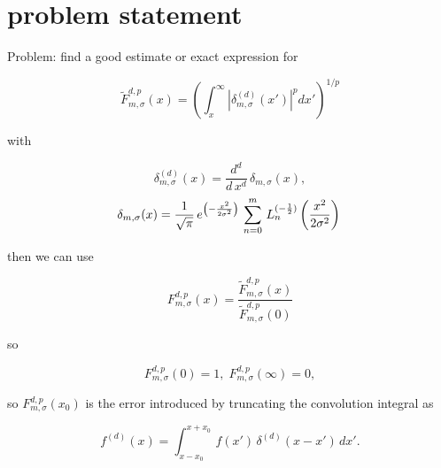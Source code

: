 \documentclass{article}
\begin{document}
\section{problem statement}

\begin{flushleft}
Problem: find a good estimate or exact expression for
\end{flushleft}

\begin{equation*}
\tilde{F}_{m,\sigma}^{d,p}(x) = \left( \int_x^\infty | \delta^{(d)}_{m,\sigma}(x') |^p dx'   \right)^{1/p}
\end{equation*}

\begin{flushleft}
with
\end{flushleft}

\begin{equation*}
\delta^{(d)}_{m,\sigma}(x) = \frac{d^d}{d \, x^d} \, \delta_{m,\sigma} (x),
\end{equation*}
\begin{equation*}
 \delta_{m,\sigma} (x) = \frac{1}{\sqrt{\pi}} \, e^{ \left( -\frac{x^2}{2 \sigma^2} \right)} \, \sum_{n=0}^{m} \, L_n^{(-\frac{1}{2})}   \left( \frac{x^2}{2 \sigma^2} \right) \\
\end{equation*}


\begin{flushleft}
then we can use 
\end{flushleft}

\begin{equation*}
F_{m,\sigma}^{d,p}(x) = \frac{ \tilde{F}_{m,\sigma}^{d,p}(x) }{ \tilde{F}_{m,\sigma}^{d,p}(0) }
\end{equation*}

\begin{flushleft}
so
\end{flushleft}

\begin{equation*}
F_{m,\sigma}^{d,p}(0) = 1, \; F_{m,\sigma}^{d,p}(\infty) = 0, 
\end{equation*}

\begin{flushleft}
so $F_{m,\sigma}^{d,p}(x_0)$ is the error introduced by truncating the convolution integral as
\end{flushleft}

\begin{equation*}
f^{(d)}(x) = \int_{x-x_0}^{x+x_0} \, f(x') \, \delta^{(d)} (x-x') \, dx'.
\end{equation*}
\end{document}
